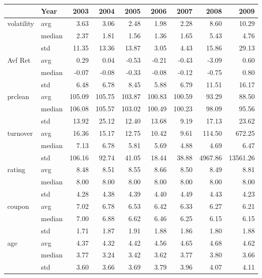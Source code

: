 \begin{tabular}{llrrrrrrr}
\toprule
 & Year & 2003 & 2004 & 2005 & 2006 & 2007 & 2008 & 2009 \\
\midrule
\multirow[t]{3}{*}{volatility} & avg & 3.63 & 3.06 & 2.48 & 1.98 & 2.28 & 8.60 & 10.29 \\
 & median & 2.37 & 1.81 & 1.56 & 1.36 & 1.65 & 5.43 & 4.76 \\
 & std & 11.35 & 13.36 & 13.87 & 3.05 & 4.43 & 15.86 & 29.13 \\
\cline{1-9}
\multirow[t]{3}{*}{Avf Ret} & avg & 0.29 & 0.04 & -0.53 & -0.21 & -0.43 & -3.09 & 0.60 \\
 & median & -0.07 & -0.08 & -0.33 & -0.08 & -0.12 & -0.75 & 0.80 \\
 & std & 6.48 & 6.78 & 8.45 & 5.88 & 6.79 & 11.51 & 16.17 \\
\cline{1-9}
\multirow[t]{3}{*}{prclean} & avg & 105.09 & 105.75 & 103.87 & 100.83 & 100.59 & 93.29 & 88.50 \\
 & median & 106.08 & 105.57 & 103.02 & 100.49 & 100.23 & 98.09 & 95.56 \\
 & std & 13.92 & 25.12 & 12.40 & 13.68 & 9.19 & 17.13 & 23.62 \\
\cline{1-9}
\multirow[t]{3}{*}{turnover} & avg & 16.36 & 15.17 & 12.75 & 10.42 & 9.61 & 114.50 & 672.25 \\
 & median & 7.13 & 6.78 & 5.81 & 5.69 & 4.88 & 4.69 & 6.47 \\
 & std & 106.16 & 92.74 & 41.05 & 18.44 & 38.88 & 4967.86 & 13561.26 \\
\cline{1-9}
\multirow[t]{3}{*}{rating} & avg & 8.48 & 8.51 & 8.55 & 8.66 & 8.50 & 8.49 & 8.81 \\
 & median & 8.00 & 8.00 & 8.00 & 8.00 & 8.00 & 8.00 & 8.00 \\
 & std & 4.28 & 4.38 & 4.39 & 4.40 & 4.49 & 4.43 & 4.23 \\
\cline{1-9}
\multirow[t]{3}{*}{coupon} & avg & 7.02 & 6.78 & 6.53 & 6.42 & 6.33 & 6.27 & 6.21 \\
 & median & 7.00 & 6.88 & 6.62 & 6.46 & 6.25 & 6.15 & 6.15 \\
 & std & 1.71 & 1.87 & 1.91 & 1.88 & 1.86 & 1.80 & 1.88 \\
\cline{1-9}
\multirow[t]{3}{*}{age} & avg & 4.37 & 4.32 & 4.42 & 4.56 & 4.65 & 4.68 & 4.62 \\
 & median & 3.77 & 3.24 & 3.42 & 3.62 & 3.77 & 3.80 & 3.66 \\
 & std & 3.60 & 3.66 & 3.69 & 3.79 & 3.96 & 4.07 & 4.11 \\

\end{tabular}

